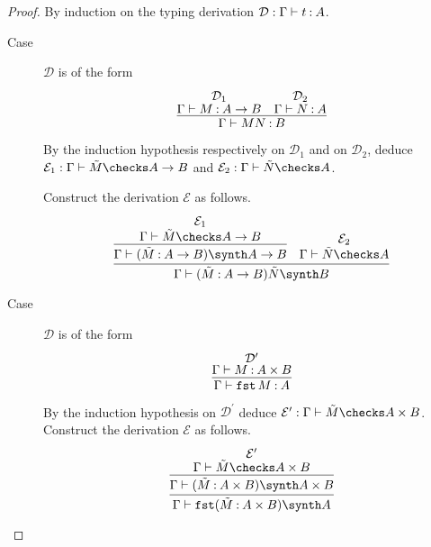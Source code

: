 \documentclass[11pt,letterpaper]{article}
\begin{document}
\begin{proof}
  By induction on the typing derivation
  $\mathcal{D} : \Gamma \vdash t \mathbin{:} A$.
  \begin{description}
    \item[Case]
      $\mathcal{D}$ is of the form
      \begin{equation*}
        \infer{
          \Gamma \proves M N \hastype B
        }{
          \deduce[\mathcal{D}_1]{\Gamma \proves M \hastype A \to B}{}
          &
          \deduce[\mathcal{D}_2]{\Gamma \proves N \hastype A}{}
        }
      \end{equation*}

      By the induction hypothesis respectively on $\mathcal{D}_1$ and on
      $\mathcal{D}_2$,
      deduce $\mathcal{E}_1 : \Gamma \proves \tilde M \checks A \to B$
      and $\mathcal{E}_2 : \Gamma \proves \tilde N \checks A$.

      Construct the derivation $\mathcal{E}$ as follows.
      \begin{equation*}
        \infer{
          \Gamma \proves (\tilde M \hastype A \to B) \tilde N \synth B
        }{
          \infer{
            \Gamma \proves (\tilde M \hastype A \to B) \synth A \to B
          }{
            \deduce[\mathcal{E}_1]{\Gamma \proves \tilde M \checks A \to B}{}
          }
          &
          \deduce[\mathcal{E}_2]{\Gamma \proves \tilde N \checks A}{}
        }
      \end{equation*}

    \item[Case]
      $\mathcal{D}$ is of the form
      \begin{equation*}
        \infer{
          \Gamma \proves \fst M \hastype A
        }{
          \deduce[\mathcal{D}^\prime]{\Gamma \proves M \hastype A \times B}{}
        }
      \end{equation*}

      By the induction hypothesis on $\mathcal{D}^\prime$
      deduce $\mathcal{E}^\prime : \Gamma \proves \tilde M \checks A \times B$.
      Construct the derivation $\mathcal{E}$ as follows.
      \begin{equation*}
        \infer{
          \Gamma \proves \fst (\tilde M \hastype A \times B) \synth A
        }{
          \infer{
            \Gamma \proves (\tilde M \hastype A \times B) \synth A \times B
          }{
            \deduce[\mathcal{E}^\prime]{
              \Gamma \proves \tilde M \checks A \times B
            }{}
          }
        }
      \end{equation*}


\end{description}
\end{proof}
\end{document}
